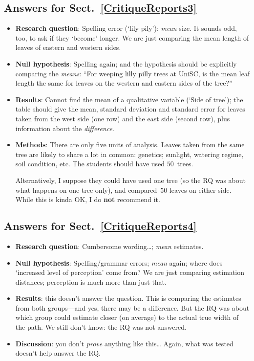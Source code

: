 \documentclass[
  11pt,
  a4paper,
  krantz2]{krantz}
\providecommand{\tightlist}{%
  \setlength{\itemsep}{0pt}\setlength{\parskip}{0pt}}
\begin{document}
\begin{footnotesize}
\subsection*{Answers for Sect.~\ref{CritiqueReports3}}\label{answers-for-sect.-refcritiquereports3}

\begin{itemize}
\item
  \textbf{Research question}: Spelling error (`lily pily'); \emph{mean} size.
  It sounds odd, too, to ask if they `become' longer.
  We are just comparing the mean length of leaves of eastern and western sides.
\item
  \textbf{Null hypothesis}: Spelling again; and the hypothesis should be explicitly comparing the \emph{means}:
  ``For weeping lilly pilly trees at UniSC, is the mean leaf length the same for leaves on the western and eastern sides of the tree?''
\item
  \textbf{Results}: Cannot find the mean of a qualitative variable (`Side of tree'); the table should give the mean, standard deviation and standard error for leaves taken from the west side (one row) and the east side (second row), plus information about the \emph{difference}.
\item
  \textbf{Methods}: There are only five units of analysis.
  Leaves taken from the same tree are likely to share a lot in common: genetics; sunlight, watering regime, soil condition, etc.
  The students should have used \(50\)~trees.

  Alternatively, I suppose they could have used one tree (so the RQ was about what happens on one tree only), and compared~\(50\) leaves on either side.
  While this is kinda OK, I do \textbf{not} recommend it.
\end{itemize}

\subsection*{Answers for Sect.~\ref{CritiqueReports4}}\label{answers-for-sect.-refcritiquereports4}

\begin{itemize}
\tightlist
\item
  \textbf{Research question}: Cumbersome wording\ldots; \emph{mean} estimates.
\item
  \textbf{Null hypothesis}: Spelling/grammar errors; \emph{mean} again; where does `increased level of perception' come from?
  We are just comparing estimation distances; perception is much more than just that.
\item
  \textbf{Results}: this doesn't answer the question.
  This is comparing the estimates from both groups---and yes, there may be a difference.
  But the RQ was about which group could estimate closer (on average) to the actual true width of the path.
  We still don't know: the RQ was not answered.
\item
  \textbf{Discussion}: you don't \emph{prove} anything like this\ldots{}
  Again, what was tested doesn't help answer the RQ.
\end{itemize}


\end{footnotesize}
\end{document}
